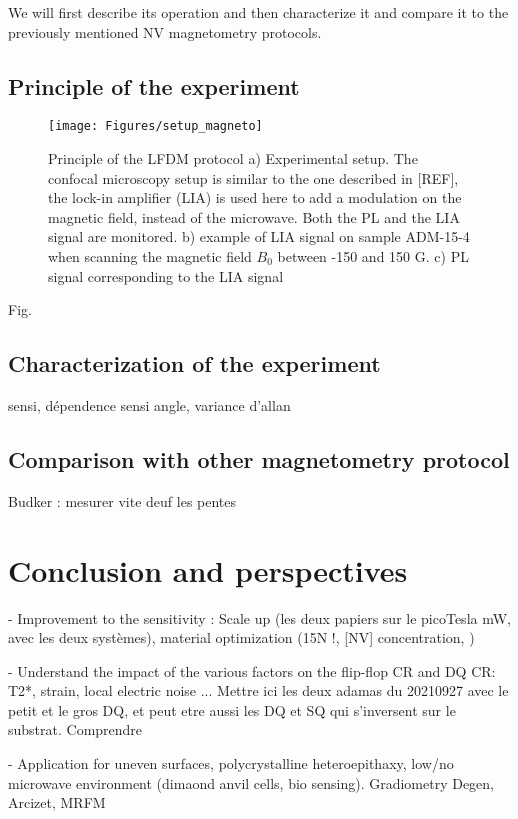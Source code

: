 \documentclass[a4paper,11pt]{report}
\begin{document}
We will first describe its operation and then characterize it and compare it to the previously mentioned NV magnetometry protocols.

\subsection{Principle of the experiment}

\begin{figure}[h!]
\centering
\texttt{[image: Figures/setup\_magneto]}
\caption{Principle of the LFDM protocol a) Experimental setup. The confocal microscopy setup is similar to the one described in [REF], the lock-in amplifier (LIA) is used here to add a modulation on the magnetic field, instead of the microwave. Both the PL and the LIA signal are monitored. b) example of LIA signal on sample ADM-15-4 when scanning the magnetic field $B_0$ between -150 and 150 G. c) PL signal corresponding to the LIA signal}
\label{setup magneto}
\end{figure}

Fig. 

\subsection{Characterization of the experiment}
sensi, dépendence sensi angle, variance d'allan
\subsection{Comparison with other magnetometry protocol}
Budker : mesurer vite deuf les pentes
\section{Conclusion and perspectives}
- Improvement to the sensitivity : Scale up (les deux papiers sur le picoTesla mW, avec les deux systèmes), material optimization (15N !, [NV] concentration, )

- Understand the impact of the various factors on the flip-flop CR and DQ CR: T2*, strain, local electric noise ... Mettre ici les deux adamas du 20210927 avec le petit et le gros DQ, et peut etre aussi les DQ et SQ qui s'inversent sur le substrat. Comprendre 

- Application for uneven surfaces, polycrystalline heteroepithaxy, low/no microwave environment (dimaond anvil cells, bio sensing). Gradiometry Degen, Arcizet, MRFM

\printbibliography
\end{document}
